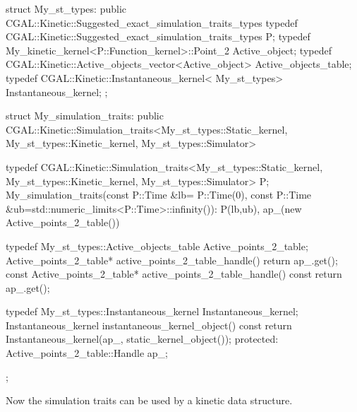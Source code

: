 \begin{ccExampleCode}
struct My_st_types: public CGAL::Kinetic::Suggested_exact_simulation_traits_types {
  typedef CGAL::Kinetic::Suggested_exact_simulation_traits_types P;
  typedef My_kinetic_kernel<P::Function_kernel>::Point_2 Active_object;
  typedef CGAL::Kinetic::Active_objects_vector<Active_object> Active_objects_table;
  typedef CGAL::Kinetic::Instantaneous_kernel< My_st_types> Instantaneous_kernel;
};

struct My_simulation_traits:
  public  CGAL::Kinetic::Simulation_traits<My_st_types::Static_kernel,
			    My_st_types::Kinetic_kernel,
			    My_st_types::Simulator>
{
  typedef  CGAL::Kinetic::Simulation_traits<My_st_types::Static_kernel,
					    My_st_types::Kinetic_kernel,
					    My_st_types::Simulator> P;
  My_simulation_traits(const P::Time &lb= P::Time(0),
		       const P::Time &ub=std::numeric_limits<P::Time>::infinity()): 
    P(lb,ub), 
    ap_(new Active_points_2_table()) {}

  typedef My_st_types::Active_objects_table Active_points_2_table;
  Active_points_2_table* active_points_2_table_handle() {
    return ap_.get();
  }
  const Active_points_2_table* active_points_2_table_handle() const {
    return ap_.get();
  }

  typedef My_st_types::Instantaneous_kernel Instantaneous_kernel;
  Instantaneous_kernel instantaneous_kernel_object() const
  {
    return Instantaneous_kernel(ap_, static_kernel_object());
  }
protected:
  Active_points_2_table::Handle ap_;
};
\end{ccExampleCode}

Now the simulation traits can be used by a kinetic data structure.
